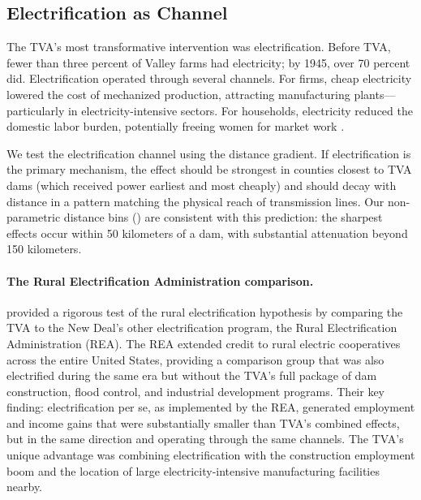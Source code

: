 \documentclass[12pt]{article}
\begin{document}
\subsection{Electrification as Channel}

The TVA's most transformative intervention was electrification. Before TVA, fewer than three percent of Valley farms had electricity; by 1945, over 70 percent did. Electrification operated through several channels. For firms, cheap electricity lowered the cost of mechanized production, attracting manufacturing plants---particularly in electricity-intensive sectors. For households, electricity reduced the domestic labor burden, potentially freeing women for market work \citep{dinkelman2011}.

We test the electrification channel using the distance gradient. If electrification is the primary mechanism, the effect should be strongest in counties closest to TVA dams (which received power earliest and most cheaply) and should decay with distance in a pattern matching the physical reach of transmission lines. Our non-parametric distance bins () are consistent with this prediction: the sharpest effects occur within 50 kilometers of a dam, with substantial attenuation beyond 150 kilometers.

\paragraph{The Rural Electrification Administration comparison.} \citet{kitchens2015} provided a rigorous test of the rural electrification hypothesis by comparing the TVA to the New Deal's other electrification program, the Rural Electrification Administration (REA). The REA extended credit to rural electric cooperatives across the entire United States, providing a comparison group that was also electrified during the same era but without the TVA's full package of dam construction, flood control, and industrial development programs. Their key finding: electrification per se, as implemented by the REA, generated employment and income gains that were substantially smaller than TVA's combined effects, but in the same direction and operating through the same channels. The TVA's unique advantage was combining electrification with the construction employment boom and the location of large electricity-intensive manufacturing facilities nearby.
\end{document}
